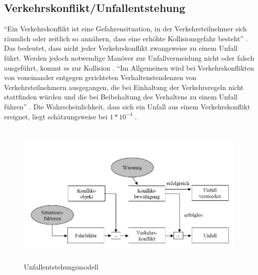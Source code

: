 \subsection{Verkehrskonflikt/Unfallentstehung}
\enquote{Ein Verkehrskonflikt ist eine Gefahrensituation, in der Verkehrsteilnehmer sich räumlich oder zeitlich so annähern, dass eine erhöhte Kollisionsgefahr besteht} \parencite[S. 26]{Erke.1978}. Das bedeutet, dass nicht jeder Verkehrskonflikt zwangsweise zu einem Unfall führt. Werden jedoch notwendige Manöver zur Unfallvermeidung nicht oder falsch ausgeführt, kommt es zur Kollision \parencite[S. 43]{Fricke.2006}. \enquote{Im Allgemeinen wird bei Verkehrskonflikten von voneinander entgegen gerichteten Verhaltenstendenzen von Verkehrsteilnehmern ausgegangen, die bei Einhaltung der Verkehrsregeln nicht stattfinden würden und die bei Beibehaltung des Verhaltens zu einem Unfall führen} \parencite[S. 10]{Hoffmann.26.04.2013}. Die Wahrscheinlichkeit, dass sich ein Unfall aus einem Verkehrskonflikt ereignet, liegt schätzungsweise bei $1\ast 10^{-4}$ \parencite[S. 99]{Reichart.2001}.

\begin{savenotes}
	\begin{figure}[H]
		\centering
		\includegraphics[width=14cm,height=7cm]{figures/Unfallentstehung}
		\caption[Unfallentstehungsmodell]{Unfallentstehungsmodell \parencite[S. 44]{Fricke.2006}}\label{fig:Unfallentstehung}
	\end{figure}
\end{savenotes}

